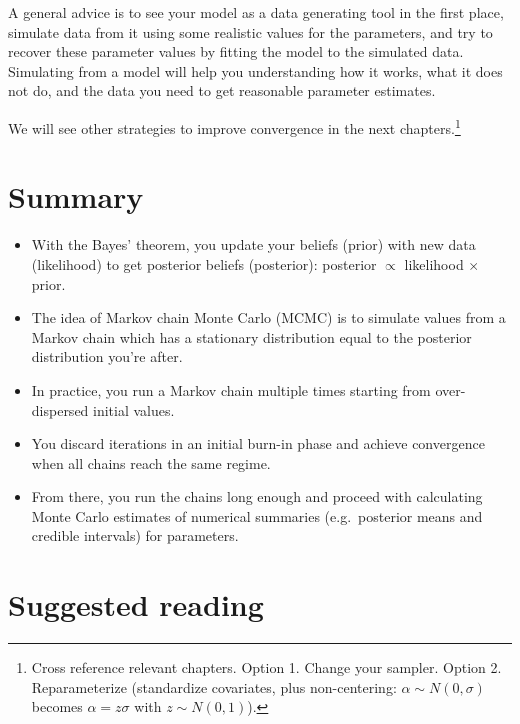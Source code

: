 \documentclass[
  12pt,
]{krantz}
\begin{document}
A general advice is to see your model as a data generating tool in the first place, simulate data from it using some realistic values for the parameters, and try to recover these parameter values by fitting the model to the simulated data. Simulating from a model will help you understanding how it works, what it does not do, and the data you need to get reasonable parameter estimates.

We will see other strategies to improve convergence in the next chapters.\footnote{Cross reference relevant chapters. Option 1. Change your sampler. Option 2. Reparameterize (standardize covariates, plus non-centering: \(\alpha \sim N(0,\sigma)\) becomes \(\alpha = z \sigma\) with \(z \sim N(0,1)\)).}

\hypertarget{summary}{%
\section{Summary}\label{summary}}

\begin{itemize}
\item
  With the Bayes' theorem, you update your beliefs (prior) with new data (likelihood) to get posterior beliefs (posterior): posterior \(\propto\) likelihood \(\times\) prior.
\item
  The idea of Markov chain Monte Carlo (MCMC) is to simulate values from a Markov chain which has a stationary distribution equal to the posterior distribution you're after.
\item
  In practice, you run a Markov chain multiple times starting from over-dispersed initial values.
\item
  You discard iterations in an initial burn-in phase and achieve convergence when all chains reach the same regime.
\item
  From there, you run the chains long enough and proceed with calculating Monte Carlo estimates of numerical summaries (e.g.~posterior means and credible intervals) for parameters.
\end{itemize}

\hypertarget{suggested-reading}{%
\section{Suggested reading}\label{suggested-reading}}
\end{document}
